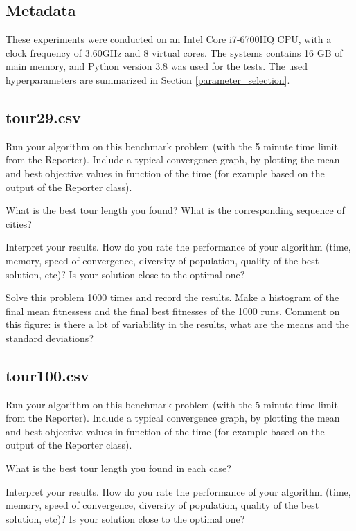 \documentclass[a4paper,10pt]{article}
\newcommand{\ReplaceMe}[1]{{\color{blue}#1}}
\begin{document}
\subsection{Metadata}


These experiments were conducted on an Intel Core i7-6700HQ CPU, with a clock frequency of 3.60GHz and 8 virtual cores. The systems contains 16 GB of main memory, and Python version 3.8 was used for the tests. The used hyperparameters are summarized in Section \ref{parameter_selection}.

\subsection{tour29.csv}

\ReplaceMe{Run your algorithm on this benchmark problem (with the 5 minute time limit from the Reporter). Include a typical convergence graph, by plotting the mean and best objective values in function of the time (for example based on the output of the Reporter class). 

What is the best tour length you found? What is the corresponding sequence of cities? 

Interpret your results. How do you rate the performance of your algorithm (time, memory, speed of convergence, diversity of population, quality of the best solution, etc)? Is your solution close to the optimal one?

Solve this problem 1000 times and record the results. Make a histogram of the final mean fitnessess and the final best fitnesses of the 1000 runs. Comment on this figure: is there a lot of variability in the results, what are the means and the standard deviations?}

\subsection{tour100.csv}

\ReplaceMe{Run your algorithm on this benchmark problem (with the 5 minute time limit from the Reporter). Include a typical convergence graph, by plotting the mean and best objective values in function of the time (for example based on the output of the Reporter class). 

What is the best tour length you found in each case? 

Interpret your results. How do you rate the performance of your algorithm (time, memory, speed of convergence, diversity of population, quality of the best solution, etc)? Is your solution close to the optimal one?}
\end{document}
